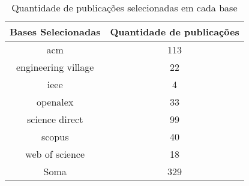 \begin{table}[H]
\caption{Quantidade de publicações selecionadas em cada base}
\label{table:tertiary_review_databases}
\begin{tabular}{c|c}
\toprule
Bases Selecionadas & Quantidade de publicações \\
\midrule
acm & 113 \\
engineering village & 22 \\
ieee & 4 \\
openalex & 33 \\
science direct & 99 \\
scopus & 40 \\
web of science & 18 \\
    \hline
Soma & 329 \\
\bottomrule
\end{tabular}
\end{table}